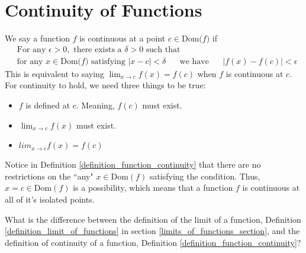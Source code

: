 \section{Continuity of Functions}

\begin{definition}
We say a function $f$ is continuous at a point $c \in \text{Dom($f$)}$ if
\begin{align*}
    &\text{For any} \hspace{4pt} \epsilon > 0, \hspace{4pt} \text{there exists a} \hspace{4pt} \delta > 0 \hspace{4pt} \text{such that}\\[2ex]
    &\text{for any} \hspace{4pt} x \in \text{Dom($f$)} \hspace{4pt} \text{satisfying} \hspace{4pt} \lvert x - c \rvert < \delta \hspace{20pt} \text{we have} \hspace{20pt} \lvert f(x) - f(c) \rvert < \epsilon
\end{align*}
This is equivalent to saying $\lim_{x \longrightarrow c} f(x) = f(c)$ when $f$ is continuous at $c$. For continuity to hold, we need three things to be true:
\begin{itemize}
    \item $f$ is defined at $c$. Meaning, $f(c)$ must exist.
    \item $\lim_{x \longrightarrow c} f(x)$ must exist.
    \item $lim_{x \longrightarrow c} f(x) = f(c)$
\end{itemize}
\label{definition_function_continuity}
\end{definition}

\begin{note}
    Notice in Definition \ref{definition_function_continuity} that there are no restrictions on the ``any" $x \in \text{Dom}(f)$ satisfying the condition. Thus, $x = c \in \text{Dom}(f)$ is a possibility, which means that a function $f$ is continuous at all of it's isolated points.
\end{note}

\begin{exercise}
What is the difference between the definition of the limit of a function, Definition \ref{definition_limit_of_functions} in section \ref{limits_of_functions_section}, and the definition of continuity of a function, Definition \ref{definition_function_continuity}?
\end{exercise}

